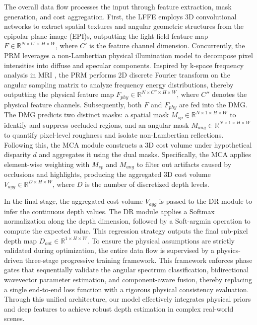 The overall data flow processes the input through feature extraction, mask generation, and cost aggregation. First, the LFFE employs 3D convolutional networks to extract spatial textures and angular geometric structures from the epipolar plane image (EPI)s, outputting the light field feature map $F \in \mathbb{R}^{N \times C' \times H \times W}$, where $C'$ is the feature channel dimension. Concurrently, the PRM leverages a non-Lambertian physical illumination model to decompose pixel intensities into diffuse and specular components. Inspired by k-space frequency analysis in MRI , the PRM performs 2D discrete Fourier transform on the angular sampling matrix to analyze frequency energy distributions, thereby outputting the physical feature map $F_{phy} \in \mathbb{R}^{N \times C'' \times H \times W}$, where $C''$ denotes the physical feature channels. Subsequently, both $F$ and $F_{phy}$ are fed into the DMG. The DMG predicts two distinct masks: a spatial mask $M_{sp} \in \mathbb{R}^{N \times 1 \times H \times W}$ to identify and suppress occluded regions, and an angular mask $M_{ang} \in \mathbb{R}^{N \times 1 \times H \times W}$ to quantify pixel-level roughness and isolate non-Lambertian reflections. Following this, the MCA module constructs a 3D cost volume under hypothetical disparity $d$ and aggregates it using the dual masks. Specifically, the MCA applies element-wise weighting with $M_{sp}$ and $M_{ang}$ to filter out artifacts caused by occlusions and highlights, producing the aggregated 3D cost volume $V_{agg} \in \mathbb{R}^{D \times H \times W}$, where $D$ is the number of discretized depth levels.

In the final stage, the aggregated cost volume $V_{agg}$ is passed to the DR module to infer the continuous depth values. The DR module applies a Softmax normalization along the depth dimension, followed by a Soft-argmin operation to compute the expected value. This regression strategy outputs the final sub-pixel depth map $D_{out} \in \mathbb{R}^{1 \times H \times W}$. To ensure the physical assumptions are strictly validated during optimization, the entire data flow is supervised by a physics-driven three-stage progressive training framework. This framework enforces phase gates that sequentially validate the angular spectrum classification, bidirectional wavevector parameter estimation, and component-aware fusion, thereby replacing a single end-to-end loss function with a rigorous physical consistency evaluation. Through this unified architecture, our model effectively integrates physical priors and deep features to achieve robust depth estimation in complex real-world scenes.

